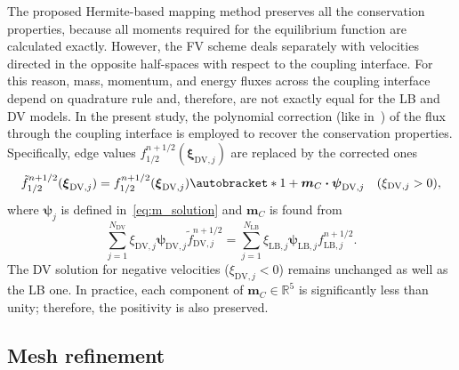 \documentclass{elsarticle} %
\DeclarePairedDelimiter\autobracket()       %
\newcommand{\br}[1]{\autobracket*{#1}}
\newcommand{\bxi}{\boldsymbol{\xi}}
\newcommand{\bpsi}{\boldsymbol{\psi}}
\newcommand{\bm}{\boldsymbol{m}}
\newcommand{\bdot}{\boldsymbol{\cdot}}
\newcommand{\LB}{\mathrm{LB}}
\newcommand{\DV}{\mathrm{DV}}
\begin{document}
The proposed Hermite-based mapping method preserves all the conservation properties,
because all moments required for the equilibrium function are calculated exactly.
However, the FV scheme deals separately with velocities
directed in the opposite half-spaces with respect to the coupling interface.
For this reason, mass, momentum, and energy fluxes across the coupling interface
depend on quadrature rule and, therefore, are not exactly equal for the LB and DV models.
In the present study, the polynomial correction (like in~\cite{Aristov1980})
of the flux through the coupling interface is employed to recover the conservation properties.
Specifically, edge values \(f^{n+1/2}_{1/2}(\bxi_{\DV,j})\) are replaced by the corrected ones
\begin{equation}\label{eq:poly_correction}
    \tilde{f}^{n+1/2}_{1/2}(\bxi_{\DV,j}) = f^{n+1/2}_{1/2}(\bxi_{\DV,j}) \br{ 1 + \bm_C\bdot\bpsi_{\DV,j} }
        \quad (\xi_{\DV,j} > 0),
\end{equation}
where \(\bpsi_j\) is defined in~\eqref{eq:m_solution} and \(\bm_C\) is found from
\begin{equation}\label{eq:m_correction}
    \sum_{j=1}^{N_{\DV}} \xi_{\DV,j} \bpsi_{\DV,j} \tilde{f}^{n+1/2}_{\DV,j} =
        \sum_{j=1}^{N_{\LB}} \xi_{\LB,j} \bpsi_{\LB,j} f^{n+1/2}_{\LB,j}.
\end{equation}
The DV solution for negative velocities (\(\xi_{\DV,j} < 0\)) remains unchanged as well as the LB one.
In practice, each component of \(\bm_C\in\mathbb{R}^5\) is significantly less than unity;
therefore, the positivity is also preserved.

\subsection{Mesh refinement}\label{sec:numerics:refinement}
\end{document}
